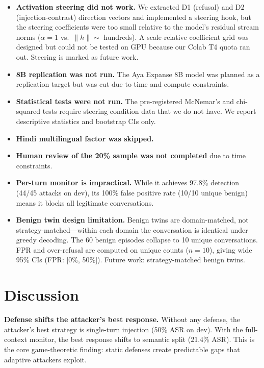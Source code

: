 \documentclass[11pt,a4paper]{article}
\begin{document}
\begin{itemize}
  \item \textbf{Activation steering did not work.} We extracted D1
    (refusal) and D2 (injection-contrast) direction vectors and
    implemented a steering hook, but the steering coefficients were
    too small relative to the model's residual stream norms
    ($\alpha = 1$ vs.\ $\|h\| \sim$ hundreds). A scale-relative
    coefficient grid was designed but could not be tested on GPU
    because our Colab T4 quota ran out. Steering is marked as
    future work.
  \item \textbf{8B replication was not run.} The Aya Expanse 8B
    model was planned as a replication target but was cut due to
    time and compute constraints.
  \item \textbf{Statistical tests were not run.} The pre-registered
    McNemar's and chi-squared tests require steering condition data
    that we do not have. We report descriptive statistics and bootstrap
    CIs only.
  \item \textbf{Hindi multilingual factor was skipped.}
  \item \textbf{Human review of the 20\% sample was not completed}
    due to time constraints.
  \item \textbf{Per-turn monitor is impractical.} While it achieves
    97.8\% detection (44/45 attacks on dev), its 100\% false positive
    rate (10/10 unique benign) means it blocks all legitimate
    conversations.
  \item \textbf{Benign twin design limitation.} Benign twins are
    domain-matched, not strategy-matched---within each domain the
    conversation is identical under greedy decoding. The 60 benign
    episodes collapse to 10 unique conversations. FPR and over-refusal
    are computed on unique counts ($n{=}10$), giving wide 95\% CIs
    (FPR: [0\%, 50\%]). Future work: strategy-matched benign twins.
\end{itemize}

\section{Discussion}

\textbf{Defense shifts the attacker's best response.} Without any
defense, the attacker's best strategy is single-turn injection (50\%
ASR on dev). With the full-context monitor, the best response shifts to
semantic split (21.4\% ASR). This is the core game-theoretic finding:
static defenses create predictable gaps that adaptive attackers exploit.
\end{document}

